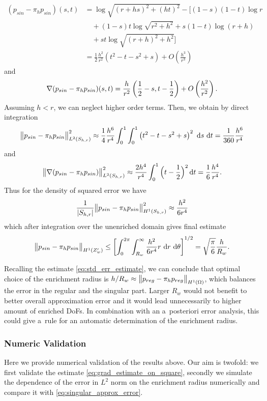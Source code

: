 \begin{align*}
 (p_{sin} - \pi_h p_{sin})(s,t)&=\log\sqrt{(r+hs)^2+(ht)^2} -\Big[(1-s)(1-t)\log r\\
 &\quad+ (1-s)t\log\sqrt{r^2+h^2} + s(1-t) \log(r+h) \\
 &\quad+ st\log\sqrt{(r+h)^2+h^2} \Big]\\
 &=\frac12 \frac{h^2}{r^2}\left(t^2-t - s^2 +s\right) + O\left(\frac{h^3}{r^3}\right)
\end{align*}
and 
\begin{equation}
 \nabla(p_{sin} - \pi_h p_{sin})(s,t) = \frac{h}{r^2} \left( \frac12-s, t-\frac12 \right) + O\left(\frac{h^2}{r^2}\right).
\end{equation}
Assuming $h<r$, we can neglect higher order terms. Then, we obtain by direct integration
\begin{align*}
 \bigl\Vert p_{sin} - \pi_h p_{sin}\bigr\Vert^2_{L^2(S_{h,r})} \approx \frac14 \frac{h^6}{r^4}\int_0^1\int_0^1 \left(t^2-t-s^2+s\right)^2\,\,{\rm d} s\, \,{\rm d} t = \frac{1}{360}\frac{h^6}{r^4} 
\end{align*}
and
\begin{equation}
    \label{eq:grad_estimate_on_square}
    \bigl\Vert\nabla(p_{sin} - \pi_h p_{sin})\bigr\Vert^2_{L^2(S_{h,r})} \approx \frac{2h^4}{r^4} \int_0^1 \Big(t-\frac12\Big)^2 \,{\rm d} t = \frac{1}{6}\frac{h^4}{r^4}.
\end{equation}
Thus for the density of squared error we have
\[
    \frac{1}{\left|S_{h,r}\right|} \bigl\Vert p_{sin} - \pi_h p_{sin}\bigr\Vert^2_{H^1(S_{h,r})} \approx \frac{h^2}{6r^4}
\]
which after integration over the unenriched domain gives final estimate
\begin{equation}
    \label{eq:singular_approx_error}
    \bigl\Vert p_{sin} - \pi_h p_{sin}\bigr\Vert_{H^1(Z'_w)} \le \left[\int_0^{2\pi} \int_{R_w}^\infty \frac{h^2} {6r^4} r \,\,{\rm d} r\, \,{\rm d} \theta\right]^{1/2} = \sqrt\frac{\pi}{6}\frac{h}{R_w}. 
\end{equation}

Recalling the estimate \eqref{eq:std_err_estimate}, we can conclude that optimal choice of the enrichment radius is $h/R_w\approx \bigl\Vert p_{reg}-\pi_h p_{reg}\bigr\Vert_{H^1(\Omega)}$, 
which balances the error in the regular and the singular part. Larger $R_w$ would not benefit to better overall approximation error and it would lead unnecessarily to
higher amount of enriched DoFs.
In combination with an a~posteriori error analysis, this could give a~rule for an automatic
determination of the enrichment radius.

\subsubsection{Numeric Validation}
Here we provide numerical validation of the results above.
Our aim is twofold: we first validate the estimate \eqref{eq:grad_estimate_on_square}, secondly we simulate 
the dependence of the error in $L^2$ norm on the enrichment radius numerically and compare it with \eqref{eq:singular_approx_error}.

